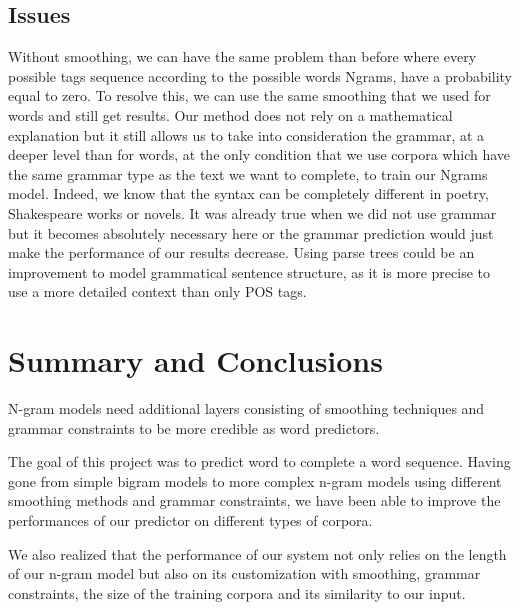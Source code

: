 \documentclass[a4paper,12pt]{article}
\begin{document}
\subsection{Issues}

Without smoothing, we can have the same problem than before where every possible tags sequence according to the possible words Ngrams, have a probability equal to zero. To resolve this, we can use the same smoothing that we used for words and still get results. Our method does not rely on a mathematical explanation but it still allows us to take into consideration the grammar, at a deeper level than for words, at the only condition that we use corpora which have the same grammar type as the text we want to complete, to train our Ngrams model. Indeed, we know that the syntax can be completely different in poetry, Shakespeare works or novels. It was already true when we did not use grammar but it becomes absolutely necessary here or the grammar prediction would just make the performance of our results decrease.
Using parse trees could be an improvement to model grammatical sentence structure, as it is more precise to use a more detailed context than only POS tags.

\section{Summary and Conclusions}
\label{sec:summary}

N-gram models need additional layers consisting of smoothing techniques and grammar constraints to be more credible as word predictors.

The goal of this project was to predict word to complete a word sequence. Having gone from simple bigram models to more complex n-gram models using different smoothing methods and grammar constraints, we have been able to improve the performances of our predictor on different types of corpora.

We also realized that the performance of our system not only relies on the length of our n-gram model but also on its customization with smoothing, grammar constraints, the size of the training corpora and its similarity to our input.


\nocite{*}


\end{document}
